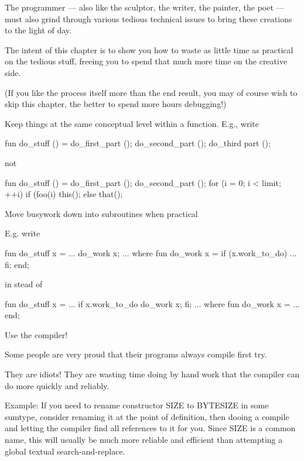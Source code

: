 The programmer --- also like the sculptor, the writer, the painter,
the poet --- must also grind through various tedious technical issues 
to bring these creations to the light of day.

The intent of this chapter is to show you how to waste as little time 
as practical on the tedious stuff, freeing you to spend that much more 
time on the creative side.

(If you like the process itself more than the end result, you may of 
course wish to skip this chapter, the better to spend more hours debugging!)




Keep things at the same conceptual level within a function.
E.g., write

    fun do_stuff ()
        = 
        {    do_first_part  ();
             do_second_part ();
             do_third part  ();
        }

not

    fun do_stuff ()
        = 
        {    do_first_part  ();
             do_second_part ();
             for (i = 0; i < limit; ++i) { 
                 if (foo(i)   this(); 
                 else         that(); 
             } 
        } 



Move busywork down into subroutines when practical 

E.g. write 

     fun do_stuff x 
         = 
         { 
             ... 
             do_work x; 
             ... 
         } 
         where 
             fun do_work x 
                 = 
                 if (x.work_to_do) 
                     ... 
                 fi; 
         end; 

in stead of 

     fun do_stuff x 
         = 
         { 
             ... 
             if x.work_to_do   do_work x;       fi; 
             ... 
         }  
         where 
             fun do_work x 
                 = 
                 ... 
         end; 

          


Use the compiler!

Some people are very proud that their programs always compile first try.

They are idiots!  They are wasting time doing by hand work that the 
compiler can do more quickly and reliably. 

Example: If you need to rename constructor SIZE to BYTESIZE in 
some sumtype, consider renaming it at the point of definition, then 
dooing a compile and letting the compiler find all references to it 
for you.  Since SIZE is a common name, this will usually be much more 
reliable and efficient than attempting a global textual 
search-and-replace.


